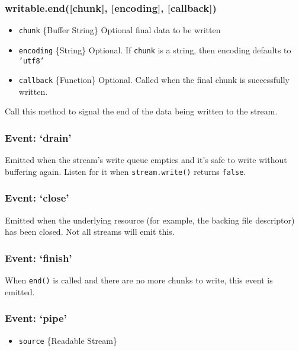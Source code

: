 \subsubsection{writable.end({[}chunk{]}, {[}encoding{]},
{[}callback{]})}

\begin{itemize}
\item
  \texttt{chunk} \{Buffer \textbar{} String\} Optional final data to be
  written
\item
  \texttt{encoding} \{String\} Optional. If \texttt{chunk} is a string,
  then encoding defaults to \texttt{'utf8'}
\item
  \texttt{callback} \{Function\} Optional. Called when the final chunk
  is successfully written.
\end{itemize}

Call this method to signal the end of the data being written to the
stream.

\subsubsection{Event: `drain'}

Emitted when the stream's write queue empties and it's safe to write
without buffering again. Listen for it when \texttt{stream.write()}
returns \texttt{false}.

\subsubsection{Event: `close'}

Emitted when the underlying resource (for example, the backing file
descriptor) has been closed. Not all streams will emit this.

\subsubsection{Event: `finish'}

When \texttt{end()} is called and there are no more chunks to write,
this event is emitted.

\subsubsection{Event: `pipe'}

\begin{itemize}
\item
  \texttt{source} \{Readable Stream\}
\end{itemize}

